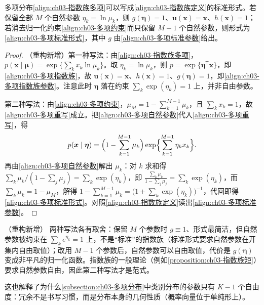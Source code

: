 \documentclass[../../main.tex]{subfiles}
\begin{document}
\begin{proposition}[多项（类别）分布的指数族形式]\label{proposition:ch03-多项指数族}
多项分布\eqref{align:ch03-指数族多项}可以写成\eqref{align:ch03-指数族定义}的标准形式。若保留全部 $M$ 个自然参数 $\eta_k=\ln\mu_k$，则 $g(\boldsymbol{\eta})=1$、$\boldsymbol{u}(\boldsymbol{x})=\boldsymbol{x}$、$h(\boldsymbol{x})=1$；若消去归一化约束\eqref{align:ch03-多项约束}而只保留 $M-1$ 个自然参数，则形式为\eqref{align:ch03-多项标准形式}，其中 $g$ 由\eqref{align:ch03-多项标准参数}给出。
\end{proposition}
\begin{proof}
（重构新增）第一种写法：由\eqref{align:ch03-指数族多项}，$p(\boldsymbol{x}\mid\boldsymbol{\mu})=\exp\{\sum_k x_k\ln\mu_k\}$。取 $\eta_k=\ln\mu_k$，则 $p=\exp\{\boldsymbol{\eta}^{\mathsf{T}}\boldsymbol{x}\}$，即\eqref{align:ch03-多项指数族}，故 $\boldsymbol{u}(\boldsymbol{x})=\boldsymbol{x}$、$h(\boldsymbol{x})=1$、$g(\boldsymbol{\eta})=1$，即\eqref{align:ch03-多项指数族参数}。注意此时 $\boldsymbol{\eta}$ 落在约束 $\sum_k\exp(\eta_k)=1$ 上，并非自由参数。

第二种写法：由\eqref{align:ch03-多项约束}，$\mu_M=1-\sum_{k=1}^{M-1}\mu_k$，且 $\sum_k x_k=1$，故\eqref{align:ch03-多项重写}成立。把\eqref{align:ch03-多项自然参数}代入\eqref{align:ch03-多项重写}，得
\begin{align*}
p(\boldsymbol{x}\mid\boldsymbol{\eta})=\Bigl(1-\sum_{k=1}^{M-1}\mu_k\Bigr)\exp\Bigl\{\sum_{k=1}^{M-1}\eta_k x_k\Bigr\}.
\end{align*}
再由\eqref{align:ch03-多项自然参数}解出 $\mu_k$：对 $k$ 求和得 $\sum_k\mu_k/(1-\sum_j\mu_j)=\sum_k\exp(\eta_k)$，即 $\frac{\sum_k\mu_k}{1-\sum_j\mu_j}=\sum_k\exp(\eta_k)$，而 $\sum_k\mu_k=1-\mu_M$，解得 $1-\sum_{k=1}^{M-1}\mu_k=\bigl(1+\sum_k\exp(\eta_k)\bigr)^{-1}$，代回即得\eqref{align:ch03-多项标准形式}。对照\eqref{align:ch03-指数族定义}读出\eqref{align:ch03-多项标准参数}。
\end{proof}

\begin{remark}（重构新增）
两种写法各有取舍：保留 $M$ 个参数时 $g\equiv1$、形式最简洁，但自然参数被约束在 $\sum_k e^{\eta_k}=1$ 上，不是“标准”的指数族（标准形式要求自然参数在开集内自由取值）；改用 $M-1$ 个参数后，自然参数可以自由取值，代价是 $g(\boldsymbol{\eta})$ 变成非平凡的归一化函数。指数族的一般理论（例如\cref{proposition:ch03-指数族矩}）要求自然参数自由，因此第二种写法才是范式。

这也解释了为什么\cref{subsection:ch03-多项分布}中类别分布的参数只有 $K-1$ 个自由度：冗余不是书写习惯，而是分布本身的几何性质（概率向量位于单纯形上）。
\end{remark}
\end{document}
